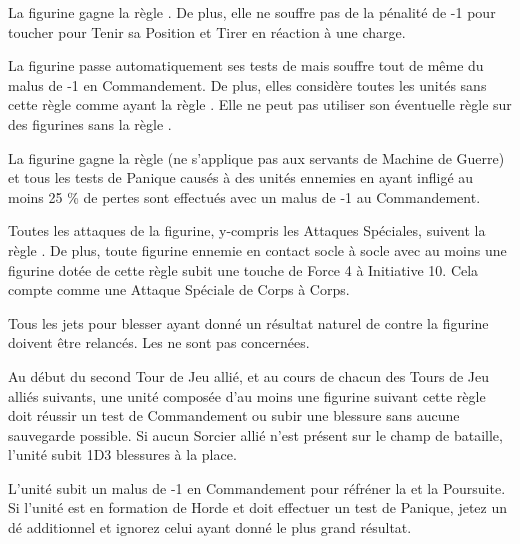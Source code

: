 \armyspecialruleentry{\sturdy{}}

La figurine gagne la règle \thunderouscharge{}. De plus, elle ne souffre pas de la pénalité de -1 pour toucher pour Tenir sa Position et Tirer en réaction à une charge.

\armyspecialruleentry{\chosenofashuruk{}}

La figurine passe automatiquement ses tests de \fear{} mais souffre tout de même du malus de -1 en Commandement. De plus, elles considère toutes les unités sans cette règle comme ayant la règle \insignificant{}. Elle ne peut pas utiliser son éventuelle règle \engineer{} sur des figurines sans la règle \chosenofashuruk{}.

\armyspecialruleentry{\daemonicinfusion{}}

La figurine gagne la règle \magicalattacks{} (ne s'applique pas aux servants de Machine de Guerre) et tous les tests de Panique causés à des unités ennemies en ayant infligé au moins 25 \% de pertes sont effectués avec un malus de -1 au Commandement.

\armyspecialruleentry{\volcanicembrace{}}

Toutes les attaques de la figurine, y-compris les Attaques Spéciales, suivent la règle \flamingattacks{}. De plus, toute figurine ennemie en contact socle à socle avec au moins une figurine dotée de cette règle subit une touche de Force 4 à Initiative 10. Cela compte comme une Attaque Spéciale de Corps à Corps.

\armyspecialruleentry{\shacklesoffire{}}

Tous les jets pour blesser ayant donné un résultat naturel de  contre la figurine doivent être relancés. Les \magicalattacks{} ne sont pas concernées.

Au début du second Tour de Jeu allié, et au cours de chacun des Tours de Jeu alliés suivants, une unité composée d'au moins une figurine suivant cette règle doit réussir un test de Commandement ou subir une blessure sans aucune sauvegarde possible. Si aucun Sorcier allié n'est présent sur le champ de bataille, l'unité subit 1D3 blessures à la place.

\armyspecialruleentry{\unruly{}}

L'unité subit un malus de -1 en Commandement pour réfréner la \frenzy{} et la Poursuite. Si l'unité est en formation de Horde et doit effectuer un test de Panique, jetez un dé additionnel et ignorez celui ayant donné le plus grand résultat.

\armyspecialruleentry{\opportunist{}}

